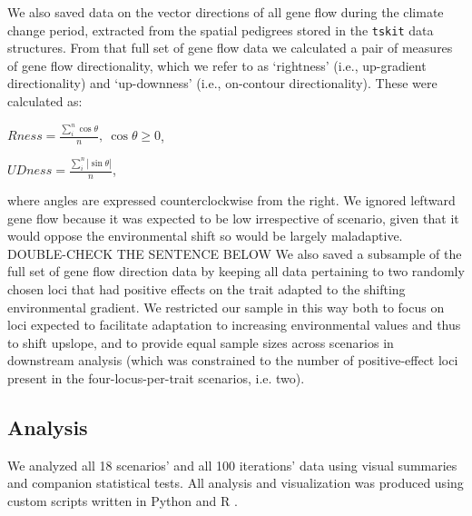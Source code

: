 \documentclass[9pt,twocolumn,twoside,lineno]{pnas-new}
\begin{document}
{We also saved data on the vector directions of all gene flow during the 
climate change period, extracted from the spatial pedigrees stored in the
\texttt{tskit} \cite{kelleher} data structures.
From that full set of gene flow data we calculated a pair of measures
of gene flow directionality,  which we refer to as ‘rightness’ (i.e., up-gradient 
directionality) and ‘up-downness’ (i.e., on-contour directionality). These were 
calculated as:

$Rness = \frac{\sum\limits_{i}^{n}\cos\theta}{n},\ \cos\theta\geq0$,

$UDness = \frac{\sum\limits_{i}^{n}|\sin\theta|}{n}$,

where angles are expressed counterclockwise from the right.
We ignored leftward gene flow because it was expected to be low irrespective 
of scenario, given that it would oppose the environmental shift so would be largely maladaptive.
DOUBLE-CHECK THE SENTENCE BELOW
We also saved a subsample of the full set of gene flow 
direction data by keeping all data pertaining to two randomly chosen loci that had 
positive effects on the trait adapted to the shifting environmental gradient. We 
restricted our sample in this way both to focus on loci expected to facilitate 
adaptation to increasing environmental values and thus to shift upslope, and to 
provide equal sample sizes across scenarios in downstream analysis (which was 
constrained to the number of positive-effect loci present in the four-locus-per-trait 
scenarios, i.e. two). 

\subsection*{Analysis}

We analyzed all 18 scenarios' and all 100 iterations' data
using visual summaries and companion statistical tests.
All analysis and visualization was produced using custom scripts written in 
Python and R \cite{r_core_team}.

}
\end{document}

